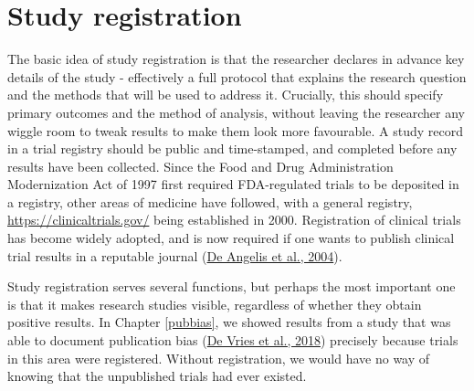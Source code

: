 \documentclass{krantz}
\begin{document}
\hypertarget{study-registration}{%
\section{Study registration}\label{study-registration}}

The basic idea of study registration is that the researcher declares in advance key details of the study - effectively a full protocol that explains the research question and the methods that will be used to address it. Crucially, this should specify primary outcomes and the method of analysis, without leaving the researcher any wiggle room to tweak results to make them look more favourable. A study record in a trial registry should be public and time-stamped, and completed before any results have been collected. Since the Food and Drug Administration Modernization Act of 1997 first required FDA-regulated trials to be deposited in a registry, other areas of medicine have followed, with a general registry, \url{https://clinicaltrials.gov/} being established in 2000. Registration of clinical trials has become widely adopted, and is now required if one wants to publish clinical trial results in a reputable journal (\protect\hyperlink{ref-deangelis2004}{De Angelis et al., 2004}).

Study registration serves several functions, but perhaps the most important one is that it makes research studies visible, regardless of whether they obtain positive results. In Chapter \ref{pubbias}, we showed results from a study that was able to document publication bias (\protect\hyperlink{ref-devries2018}{De Vries et al., 2018}) precisely because trials in this area were registered. Without registration, we would have no way of knowing that the unpublished trials had ever existed.
\end{document}

